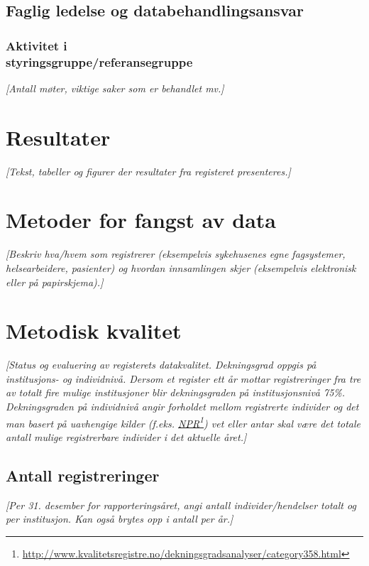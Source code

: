 \documentclass[norsk, a4paper, twocolumn]{report}
\newcommand{\guide}[1] {
	\textit{[\textcolor{guidegray}{#1}]}
	}
\begin{document}
\section{Faglig ledelse og databehandlingsansvar}\label{cha:led}
\subsection{Aktivitet i\\styringsgruppe/referansegruppe}
\guide{Antall møter, viktige saker som er behandlet mv.}




\chapter{Resultater}\label{cha:res}
\guide{Tekst, tabeller og figurer der resultater fra registeret presenteres.}




\chapter{Metoder for fangst av data}\label{cha:metoder}
\guide{Beskriv hva/hvem som registrerer (eksempelvis sykehusenes egne
fagsystemer, helsearbeidere, pasienter) og hvordan innsamlingen skjer
(eksempelvis elektronisk eller på papirskjema).}




\chapter{Metodisk kvalitet}\label{cha:kva}
\guide{Status og evaluering av registerets  datakvalitet.
Dekningsgrad oppgis på institusjons- og individnivå. Dersom
et register ett år mottar registreringer fra tre
av totalt fire mulige institusjoner blir dekningsgraden på
institusjonsnivå 75\%. Dekningsgraden på individnivå angir
forholdet mellom registrerte individer og det man basert på uavhengige
kilder (f.eks.
\href{http://www.kvalitetsregistre.no/dekningsgradsanalyser/category358.html}
{NPR}\footnote{\url{http://www.kvalitetsregistre.no/dekningsgradsanalyser/category358.html}})
vet eller antar skal være det totale antall mulige registrerbare
individer i det aktuelle året.}

\section{Antall registreringer}\label{sec:reg}
\guide{Per 31. desember for rapporteringsåret, angi antall
individer/hendelser totalt og per institusjon. Kan også brytes opp i antall per år.}
\end{document}
